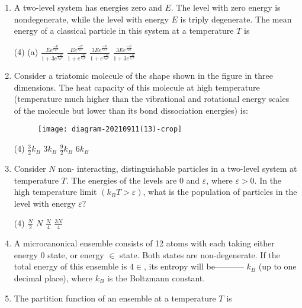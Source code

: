 \begin{enumerate}
	{}
	\item A two-level system has energies zero and $E$. The level with zero energy is nondegenerate, while the level with energy $E$ is triply degenerate. The mean energy of a classical particle in this system at a temperature $T$ is
	{}
	\begin{tasks}(4)
		\task[\textbf{A.}] (a) $\frac{E e^{\frac{-E}{k_{B} T}}}{1+3 e^{\frac{-E}{k_{B} T}}}$
		\task[\textbf{B.}] $\frac{E e^{\frac{-E}{k_{B} T}}}{1+e^{\frac{-E}{k_{s} T}}}$
		\task[\textbf{C.}] $\frac{3 E e^{\frac{-E}{k_{B} T}}}{1+e^{\frac{-E}{k_{B} T}}}$
		\task[\textbf{D.}] $\frac{3 E e^{\frac{-E}{k_{B} T}}}{1+3 e^{\frac{-E}{k_{s} T}}}$
	\end{tasks}	
	\item Consider a triatomic molecule of the shape shown in the figure in three dimensions. The heat capacity of this molecule at high temperature (temperature much higher than the vibrational and rotational energy scales of the molecule but lower than its bond dissociation energies) is:
	{}
	\begin{figure}[H]
		\centering
		\texttt{[image: diagram-20210911(13)-crop]}
	\end{figure}
	\begin{tasks}(4)
		\task[\textbf{A.}] $\frac{3}{2} k_{B}$
		\task[\textbf{B.}] $3 k_{B}$
		\task[\textbf{C.}] $\frac{9}{2} k_{B}$
		\task[\textbf{D.}] $6 k_{B}$
	\end{tasks}
	\item Consider $N$ non- interacting, distinguishable particles in a two-level system at temperature $T$. The energies of the levels are 0 and $\varepsilon$, where $\varepsilon>0$. In the high temperature limit $\left(k_{B} T>\varepsilon\right)$, what is the population of particles in the level with energy $\varepsilon ?$
	{}
	\begin{tasks}(4)
		\task[\textbf{A.}] $\frac{N}{2}$
		\task[\textbf{B.}] $N$
		\task[\textbf{C.}] $\frac{N}{4}$
		\task[\textbf{D.}] $\frac{3 N}{4}$
	\end{tasks}
	\item  A microcanonical ensemble consists of 12 atoms with each taking either energy 0 state, or energy $\in$ state. Both states are non-degenerate. If the total energy of this ensemble is $4 \in$, its entropy will be----------- $k_{B}$ (up to one decimal place), where $k_{B}$ is the Boltzmann constant.
	{}
	\item  The partition function of an ensemble at a temperature $T$ is

\end{enumerate}
